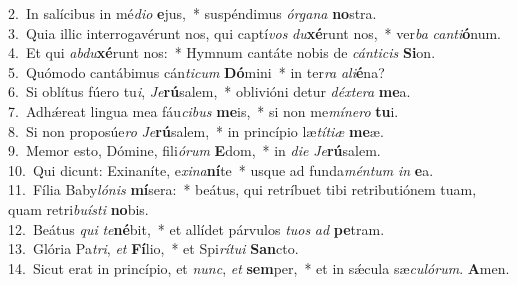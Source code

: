 {2.~}In salícibus in mé\textit{di}\textit{o} \textbf{e}jus,~* suspéndimus \textit{ór}\textit{ga}\textit{na} \textbf{no}stra.\\
{3.~}Quia illic interrogavérunt nos, qui captí\textit{vos} \textit{du}\textbf{xé}runt nos,~* ver\textit{ba} \textit{can}\textit{ti}\textbf{ó}num.\\
{4.~}Et qui \textit{ab}\textit{du}\textbf{xé}runt nos:~* Hymnum cantáte nobis de \textit{cán}\textit{ti}\textit{cis} \textbf{Si}on.\\
{5.~}Quómodo cantábimus cán\textit{ti}\textit{cum} \textbf{Dó}mini~* in ter\textit{ra} \textit{a}\textit{li}\textbf{é}na?\\
{6.~}Si oblítus fúero tu\textit{i}, \textit{Je}\textbf{rú}salem,~* oblivióni detur \textit{déx}\textit{te}\textit{ra} \textbf{me}a.\\
{7.~}Adhǽreat lingua mea fáu\textit{ci}\textit{bus} \textbf{me}is,~* si non me\textit{mí}\textit{ne}\textit{ro} \textbf{tu}i.\\
{8.~}Si non proposúe\textit{ro} \textit{Je}\textbf{rú}salem,~* in princípio læ\textit{tí}\textit{ti}\textit{æ} \textbf{me}æ.\\
{9.~}Memor esto, Dómine, fili\textit{ó}\textit{rum} \textbf{E}dom,~* in \textit{di}\textit{e} \textit{Je}\textbf{rú}salem.\\
{10.~}Qui dicunt: Exinaníte, e\textit{xi}\textit{na}\textbf{ní}te~* usque ad funda\textit{mén}\textit{tum} \textit{in} \textbf{e}a.\\
{11.~}Fília Baby\textit{ló}\textit{nis} \textbf{mí}sera:~* beátus, qui retríbuet tibi retributiónem tuam, quam retri\textit{bu}\textit{í}\textit{sti} \textbf{no}bis.\\
{12.~}Beátus \textit{qui} \textit{te}\textbf{né}bit,~* et allídet párvulos \textit{tu}\textit{os} \textit{ad} \textbf{pe}tram.\\
{13.~}Glória Pa\textit{tri}, \textit{et} \textbf{Fí}lio,~* et Spi\textit{rí}\textit{tu}\textit{i} \textbf{San}cto.\\
{14.~}Sicut erat in princípio, et \textit{nunc}, \textit{et} \textbf{sem}per,~* et in sǽcula sæ\textit{cu}\textit{ló}\textit{rum}. \textbf{A}men.\\

